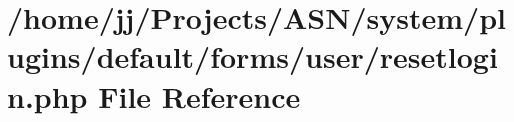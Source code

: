 \hypertarget{system_2plugins_2default_2forms_2user_2resetlogin_8php}{}\section{/home/jj/\+Projects/\+A\+S\+N/system/plugins/default/forms/user/resetlogin.php File Reference}
\label{system_2plugins_2default_2forms_2user_2resetlogin_8php}
